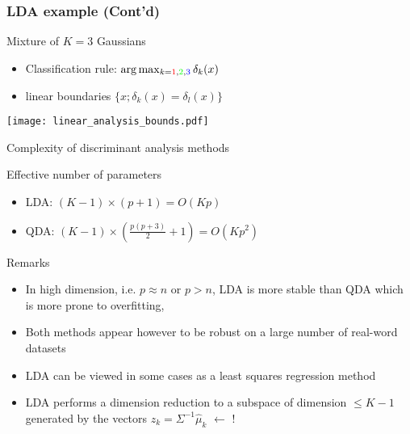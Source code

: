 \begin{frame}
  \frametitle{LDA example (Cont'd)}
\begin{block}{Mixture of $K=3$ Gaussians}
\begin{itemize}
   \item  Classification rule:  $\arg \max_{k=\textcolor{red}{1},\textcolor{green}{2},\textcolor{blue}{3}}
\delta_k(x)$
\item linear boundaries $\{ x ; \delta_k(x)=\delta_l(x) \} $
\end{itemize}
\end{block}

\begin{center}
  \texttt{[image: linear\_analysis\_bounds.pdf]} \\
\end{center}

\end{frame}


\begin{frame}{Complexity of discriminant analysis methods}
\begin{block}{Effective number of parameters}
\begin{itemize}
   \item LDA: $(K-1) \times (p+1) = O(Kp)$
   \item QDA: $(K-1) \times \left( \frac{p(p+3)}{2} +1 \right) = O(Kp^2)$
\end{itemize}
\end{block}

\begin{block}{Remarks}
\begin{itemize}
   \item In high dimension, i.e. $p \approx n$  or $p>n$, LDA is more stable than QDA which is more prone to overfitting,
   \item Both methods appear however to be  robust on a large number of real-word datasets
   \item LDA can be viewed in some cases as a least squares regression method
   \item LDA performs a dimension reduction to a subspace of dimension $\le K-1$ generated by
   the vectors $z_k=\Sigma^{-1} \widehat{\mu}_k$  $\leftarrow$ \quad !
\end{itemize}
\end{block}
\end{frame}



